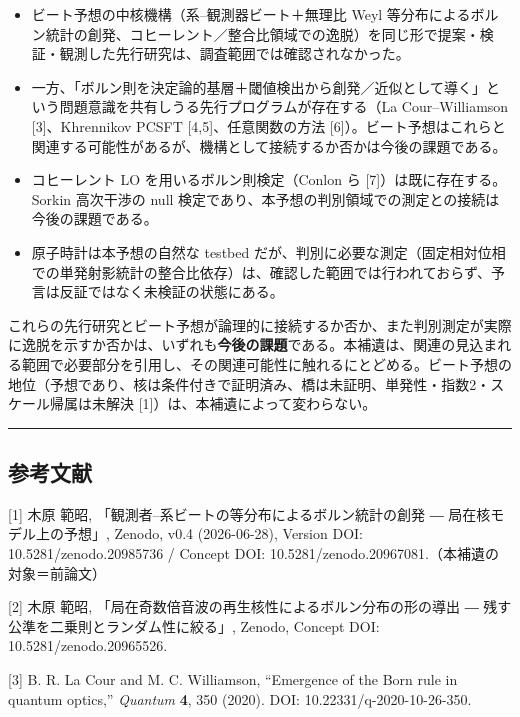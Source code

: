 \documentclass[
]{ltjsarticle}
\providecommand{\tightlist}{%
  \setlength{\itemsep}{0pt}\setlength{\parskip}{0pt}}
\begin{document}
\begin{itemize}
\tightlist
\item
  ビート予想の中核機構（系--観測器ビート＋無理比 Weyl
  等分布によるボルン統計の創発、コヒーレント／整合比領域での逸脱）を同じ形で提案・検証・観測した先行研究は、調査範囲では確認されなかった。
\item
  一方、「ボルン則を決定論的基層＋閾値検出から創発／近似として導く」という問題意識を共有しうる先行プログラムが存在する（La
  Cour--Williamson {[}3{]}、Khrennikov PCSFT {[}4,5{]}、任意関数の方法
  {[}6{]}）。ビート予想はこれらと関連する可能性があるが、機構として接続するか否かは今後の課題である。
\item
  コヒーレント LO を用いるボルン則検定（Conlon ら
  {[}7{]}）は既に存在する。Sorkin 高次干渉の null
  検定であり、本予想の判別領域での測定との接続は今後の課題である。
\item
  原子時計は本予想の自然な testbed
  だが、判別に必要な測定（固定相対位相での単発射影統計の整合比依存）は、確認した範囲では行われておらず、予言は反証ではなく未検証の状態にある。
\end{itemize}

これらの先行研究とビート予想が論理的に接続するか否か、また判別測定が実際に逸脱を示すか否かは、いずれも\textbf{今後の課題}である。本補遺は、関連の見込まれる範囲で必要部分を引用し、その関連可能性に触れるにとどめる。ビート予想の地位（予想であり、核は条件付きで証明済み、橋は未証明、単発性・指数2・スケール帰属は未解決
{[}1{]}）は、本補遺によって変わらない。

\begin{center}\rule{0.5\linewidth}{0.5pt}\end{center}

\subsection{参考文献}\label{ux53c2ux8003ux6587ux732e}

{[}1{]} 木原 範昭, 「観測者--系ビートの等分布によるボルン統計の創発 ―
局在核モデル上の予想」, Zenodo, v0.4 (2026-06-28), Version DOI:
10.5281/zenodo.20985736 / Concept DOI:
10.5281/zenodo.20967081.（本補遺の対象＝前論文）

{[}2{]} 木原 範昭, 「局在奇数倍音波の再生核性によるボルン分布の形の導出
― 残す公準を二乗則とランダム性に絞る」, Zenodo, Concept DOI:
10.5281/zenodo.20965526.

{[}3{]} B. R. La Cour and M. C. Williamson, ``Emergence of the Born rule
in quantum optics,'' \emph{Quantum} \textbf{4}, 350 (2020). DOI:
10.22331/q-2020-10-26-350.
\end{document}
